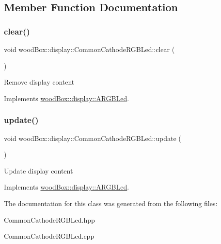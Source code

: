 \subsection{Member Function Documentation}
\mbox{\label{classwood_box_1_1display_1_1_common_cathode_r_g_b_led_a4ae3f4b7e03751dd6352adfa1b90fca0}} 
\subsubsection{\texorpdfstring{clear()}{clear()}}
{\footnotesize\ttfamily void wood\+Box\+::display\+::\+Common\+Cathode\+R\+G\+B\+Led\+::clear (\begin{DoxyParamCaption}{ }\end{DoxyParamCaption})\hspace{0.3cm}{\ttfamily [virtual]}}

Remove display content 

Implements \mbox{\hyperlink{classwood_box_1_1display_1_1_a_r_g_b_led_a01eeaee1bbb439e81f5f9bc536c04df7}{wood\+Box\+::display\+::\+A\+R\+G\+B\+Led}}.

\mbox{\label{classwood_box_1_1display_1_1_common_cathode_r_g_b_led_a597c7ae002c7f94431ccaafd160a857a}} 
\subsubsection{\texorpdfstring{update()}{update()}}
{\footnotesize\ttfamily void wood\+Box\+::display\+::\+Common\+Cathode\+R\+G\+B\+Led\+::update (\begin{DoxyParamCaption}{ }\end{DoxyParamCaption})\hspace{0.3cm}{\ttfamily [virtual]}}

Update display content 

Implements \mbox{\hyperlink{classwood_box_1_1display_1_1_a_r_g_b_led_ab71f321d91e931f95b96d1f492a9454d}{wood\+Box\+::display\+::\+A\+R\+G\+B\+Led}}.



The documentation for this class was generated from the following files\+:\begin{DoxyCompactItemize}
\item 
Common\+Cathode\+R\+G\+B\+Led.\+hpp\item 
Common\+Cathode\+R\+G\+B\+Led.\+cpp\end{DoxyCompactItemize}
